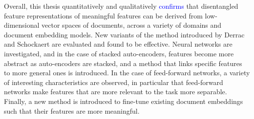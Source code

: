 \documentclass[a4paper,oneside,onecolumn,openright,12pt]{book}
\newcommand\hmark[1]{\textcolor{blue}{#1}}
\begin{document}
Overall, this thesis quantitatively and qualitatively \hmark{confirms}  that disentangled feature representations of meaningful features can be derived from low-dimensional vector spaces of documents, across a variety of domains and document embedding models.  New variants of the method introduced by Derrac and Schockaert \cite{Derrac2015} are evaluated and found to be effective. Neural networks are investigated, and in the case of  stacked auto-encoders,  features become more abstract as auto-encoders are stacked, and a method that links specific features to more general ones is introduced. In the case of feed-forward networks, a variety of interesting characteristics are observed, in particular that feed-forward networks make features that are more relevant to the task more separable. Finally, a new method is introduced to fine-tune existing document embeddings such that their features are more meaningful. 









 




 
\end{document}
